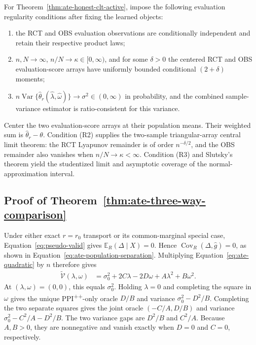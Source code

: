 For Theorem~\ref{thm:ate-honest-clt-active}, impose the following evaluation
regularity conditions after fixing the learned objects:
\begin{enumerate}
\item[(R1)] the RCT and OBS evaluation observations are conditionally
independent and retain their respective product laws;
\item[(R2)] $n,N\to\infty$, $n/N\to\kappa\in[0,\infty)$, and for some
$\delta>0$ the centered RCT and OBS evaluation-score arrays have uniformly
bounded conditional $(2+\delta)$ moments;
\item[(R3)]
$n\operatorname{Var}\{\widehat\theta_r(\widehat\lambda,
\widehat\omega)\}\to\sigma^2\in(0,\infty)$ in probability, and the combined
sample-variance estimator is ratio-consistent for this variance.
\end{enumerate}
Center the two evaluation-score arrays at their population means. Their
weighted sum is $\widehat\theta_r-\theta$. Condition (R2) supplies the
two-sample triangular-array central limit theorem: the RCT Lyapunov remainder
is of order $n^{-\delta/2}$, and the OBS remainder also vanishes when
$n/N\to\kappa<\infty$. Condition (R3) and Slutsky's theorem yield the
studentized limit and asymptotic coverage of the normal-approximation interval.

\subsection{Proof of Theorem~\ref{thm:ate-three-way-comparison}}
\label{app:ate-three-way-comparison}

Under either exact $r=r_0$ transport or its common-marginal special case,
Equation~\eqref{eq:pseudo-valid} gives
$\mathbb E_R(\Delta\mid X)=0$. Hence
$\operatorname{Cov}_R(\Delta,\widehat{g})=0$, as shown in
Equation~\eqref{eq:ate-population-separation}. Multiplying
Equation~\eqref{eq:ate-quadratic} by $n$ therefore gives
\begin{align*}
\widetilde{\mathcal V}(\lambda,\omega)
&=
\sigma_0^2+2C\lambda-2D\omega+A\lambda^2+B\omega^2.
\end{align*}
At $(\lambda,\omega)=(0,0)$, this equals $\sigma_0^2$. Holding
$\lambda=0$ and completing the square in $\omega$ gives the unique
PPI\textsuperscript{++}-only oracle $D/B$ and variance $\sigma_0^2-D^2/B$. Completing the
two separate squares gives the joint oracle $(-C/A,D/B)$ and variance
$\sigma_0^2-C^2/A-D^2/B$. The two variance gaps are $D^2/B$ and
$C^2/A$. Because $A,B>0$, they are nonnegative and vanish exactly when
$D=0$ and $C=0$, respectively.


